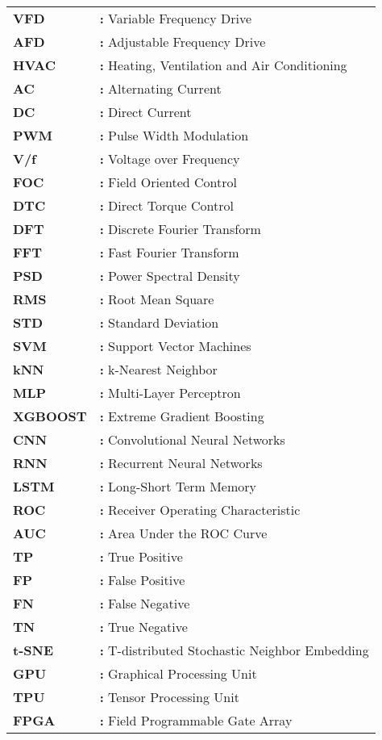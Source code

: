 \begin{tabular}{@{}p{2cm}l}
{\bf{VFD}} & {\bf:} Variable Frequency Drive\\
{\bf AFD} & {\bf:} Adjustable Frequency Drive\\
{\bf HVAC} & {\bf:} Heating, Ventilation and Air Conditioning\\
{\bf AC} & {\bf:} Alternating Current\\
{\bf DC} & {\bf:} Direct Current\\
{\bf PWM} & {\bf:} Pulse Width Modulation\\
{\bf V/f} & {\bf:} Voltage over Frequency\\
{\bf FOC} & {\bf:} Field Oriented Control\\
{\bf DTC} & {\bf:} Direct Torque Control\\
{\bf DFT} & {\bf:} Discrete Fourier Transform\\
{\bf FFT} & {\bf:} Fast Fourier Transform\\
{\bf PSD} & {\bf:} Power Spectral Density\\
{\bf RMS} & {\bf:} Root Mean Square\\
{\bf STD} & {\bf:} Standard Deviation\\
{\bf SVM} & {\bf:} Support Vector Machines\\
{\bf kNN} & {\bf:} k-Nearest Neighbor\\
{\bf MLP} & {\bf:} Multi-Layer Perceptron\\
{\bf XGBOOST} & {\bf:} Extreme Gradient Boosting\\
{\bf CNN} & {\bf:} Convolutional Neural Networks\\
{\bf RNN} & {\bf:} Recurrent Neural Networks\\
{\bf LSTM} & {\bf:} Long-Short Term Memory\\
{\bf ROC} & {\bf:} Receiver Operating Characteristic\\
{\bf AUC} & {\bf:} Area Under the ROC Curve\\
{\bf TP} & {\bf:} True Positive\\
{\bf FP} & {\bf:} False Positive\\
{\bf FN} & {\bf:} False Negative\\
{\bf TN} & {\bf:} True Negative\\
{\bf t-SNE} & {\bf:} T-distributed Stochastic Neighbor Embedding\\
{\bf GPU} & {\bf:} Graphical Processing Unit\\
{\bf TPU} & {\bf:} Tensor Processing Unit\\
{\bf FPGA} & {\bf:} Field Programmable Gate Array\\
\end{tabular}

